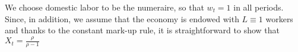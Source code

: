 \documentclass[onehalfspacing,11pt]{article}
\begin{document}
We choose domestic labor to be the numeraire, so that $w_t=1$ in all periods. Since, in addition, we assume that the economy is endowed with $L \equiv 1$ workers and thanks to the constant mark-up rule, it is straightforward to show that $X_t = \frac{\rho}{\rho-1}$
%
%
\end{document}
